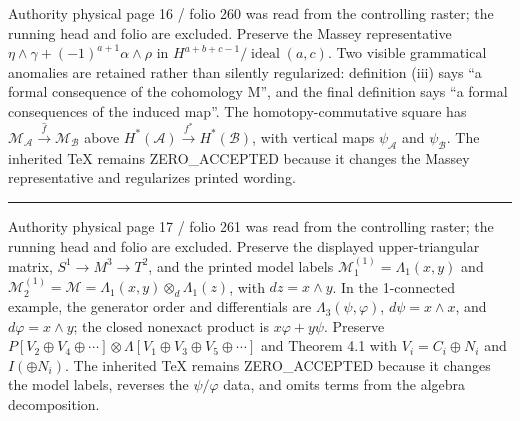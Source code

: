\documentclass[
  english,
  a3paper,
  a3paper]{extarticle}
\begin{document}
\fontsize{11}{14}\selectfont

Authority physical page 16 / folio 260 was read from the controlling
raster; the running head and folio are excluded. Preserve the Massey
representative \(\eta\wedge\gamma+(-1)^{a+1}\alpha\wedge\rho\) in
\(H^{a+b+c-1}/\operatorname{ideal}(a,c)\). Two visible grammatical
anomalies are retained rather than silently regularized: definition
(iii) says ``a formal consequence of the cohomology M'', and the final
definition says ``a formal consequences of the induced map''. The
homotopy-commutative square has
\(\mathcal M_{\mathcal A}\xrightarrow{\widehat f}\mathcal M_{\mathcal B}\)
above \(H^*(\mathcal A)\xrightarrow{f^*}H^*(\mathcal B)\), with vertical
maps \(\psi_{\mathcal A}\) and \(\psi_{\mathcal B}\). The inherited TeX
remains ZERO\_ACCEPTED because it changes the Massey representative and
regularizes printed wording.

\clearpage



\par

\vspace{0.7mm}\hrule\vspace{1.6mm}

\fontsize{11}{14}\selectfont

Authority physical page 17 / folio 261 was read from the controlling
raster; the running head and folio are excluded. Preserve the displayed
upper-triangular matrix, \(S^1\to M^3\to T^2\), and the printed model
labels \(\mathcal M_1^{(1)}=\Lambda_1(x,y)\) and
\(\mathcal M_2^{(1)}=\mathcal M=\Lambda_1(x,y)\otimes_d\Lambda_1(z)\),
with \(dz=x\wedge y\). In the 1-connected example, the generator order
and differentials are \(\Lambda_3(\psi,\varphi)\), \(d\psi=x\wedge x\),
and \(d\varphi=x\wedge y\); the closed nonexact product is
\(x\varphi+y\psi\). Preserve
\(P[V_2\oplus V_4\oplus\cdots]\otimes\Lambda[V_1\oplus V_3\oplus V_5\oplus\cdots]\)
and Theorem 4.1 with \(V_i=C_i\oplus N_i\) and \(I(\oplus N_i)\). The
inherited TeX remains ZERO\_ACCEPTED because it changes the model
labels, reverses the \(\psi/\varphi\) data, and omits terms from the
algebra decomposition.

\clearpage


\end{document}

